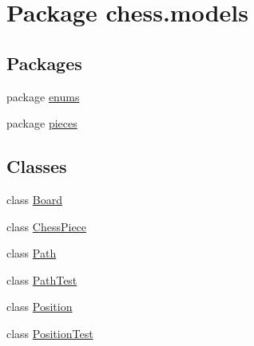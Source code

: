 \hypertarget{namespacechess_1_1models}{}\section{Package chess.\+models}
\label{namespacechess_1_1models}
\subsection*{Packages}
\begin{DoxyCompactItemize}
\item 
package \mbox{\hyperlink{namespacechess_1_1models_1_1enums}{enums}}
\item 
package \mbox{\hyperlink{namespacechess_1_1models_1_1pieces}{pieces}}
\end{DoxyCompactItemize}
\subsection*{Classes}
\begin{DoxyCompactItemize}
\item 
class \mbox{\hyperlink{classchess_1_1models_1_1_board}{Board}}
\item 
class \mbox{\hyperlink{classchess_1_1models_1_1_chess_piece}{Chess\+Piece}}
\item 
class \mbox{\hyperlink{classchess_1_1models_1_1_path}{Path}}
\item 
class \mbox{\hyperlink{classchess_1_1models_1_1_path_test}{Path\+Test}}
\item 
class \mbox{\hyperlink{classchess_1_1models_1_1_position}{Position}}
\item 
class \mbox{\hyperlink{classchess_1_1models_1_1_position_test}{Position\+Test}}
\end{DoxyCompactItemize}
